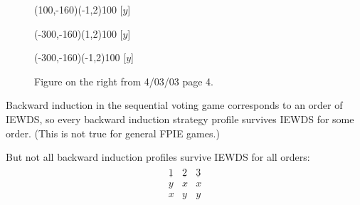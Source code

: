 \documentclass[12pt]{article}
\newcommand{\n}{\noindent}
\newcommand{\s}{\vspace{5mm}}
\begin{document}
\begin{figure}[htb]
\begin{egame}
\putbranch(100,-160)(-1,2){100}
[$y$]

\renewcommand{\egarrowstyle}{}

\putbranch(-300,-160)(1,2){100}
[$y$]

\renewcommand{\egarrowstyle}{}

\putbranch(-300,-160)(-1,2){100}
[$y$]


%
\end{egame}
\hspace*{\fill}\s\s\s\s\s\s\s\s\s
\caption[]{Figure on the right from 4/03/03 page 4.}\label{f:three}
\end{figure}

\s
\n Backward induction in the sequential voting game corresponds to an order of IEWDS, so every backward induction strategy profile survives IEWDS for some order.  (This is not true for general FPIE games.)

\s
\n But not all backward induction profiles survive IEWDS for all orders:
\begin{eqnarray*}
\begin{array}{ccc}
\underline{1}&\underline{2}&\underline{3}\\
y&x&x\\
x&y&y\\
\end{array}
\end{eqnarray*}
\end{document}
